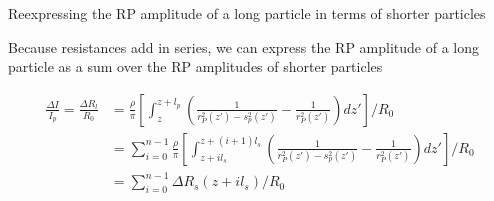 \begin{frame}[c]{Reexpressing the RP amplitude of a long particle in terms of shorter particles}
	
	
	{\footnotesize
	Because resistances add in series, we can express the RP amplitude of a long particle as a sum over the RP amplitudes of shorter particles
	}
	
	
	{\scriptsize
		\begin{equation*}
			\begin{split}
				\frac{\Delta I}{I_{p}}=\frac{\Delta R_{l}}{R_{0}} &= \frac{\rho}{\pi}\left[\int_{z}^{z+l_{p}}\left(\frac{1}{r_{P}^{2}\left(z'\right)-s_{p}^{2}\left(z'\right)}-\frac{1}{r_{P}^{2}\left(z'\right)}\right)dz'\right]/R_{0} \\
				&= \sum_{i=0}^{n-1}\frac{\rho}{\pi}\left[\int_{z+il_{s}}^{z+\left(i+1\right)l_{s}}\left(\frac{1}{r^{2}_{P}\left(z'\right)-s^{2}_{p}\left(z'\right)}-\frac{1}{r_{P}^{2}\left(z'\right)}\right)dz'\right]/R_{0} \\
				&= \sum_{i=0}^{n-1}\Delta R_{s}\left(z+il_{s}\right)/R_{0}
			\end{split}
		\end{equation*}
	}
	
		

\end{frame}





